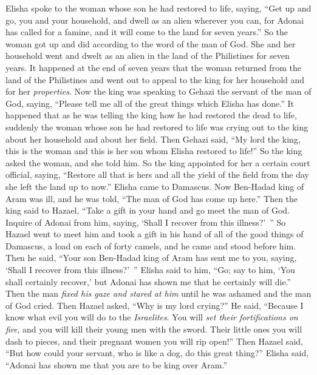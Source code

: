 \begin{biblechapter} %
 Elisha spoke to the woman whose son he had restored to life, saying, “Get up and go, you and your household, and dwell as an alien wherever you can, for Adonai has called for a famine, and it will come to the land for seven years.”
\verse So the woman got up and did according to the word of the man of God. She and her household went and dwelt as an alien in the land of the Philistines for seven years.
\verse It happened at the end of seven years that the woman returned from the land of the Philistines and went out to appeal to the king for her household and for her \textit{properties}.
\verse Now the king was speaking to Gehazi the servant of the man of God, saying, “Please tell me all of the great things which Elisha has done.”
\verse It happened that as he was telling the king how he had restored the dead to life, suddenly the woman whose son he had restored to life was crying out to the king about her household and about her field. Then Gehazi said, “My lord the king, this is the woman and this is her son whom Elisha restored to life!”
\verse So the king asked the woman, and she told him. So the king appointed for her a certain court official, saying, “Restore all that is hers and all the yield of the field from the day she left the land up to now.”
\verse Elisha came to Damascus. Now Ben-Hadad king of Aram was ill, and he was told, “The man of God has come up here.”
\verse Then the king said to Hazael, “Take a gift in your hand and go meet the man of God. Inquire of Adonai from him, saying, ‘Shall I recover from this illness?’ ”
\verse So Hazael went to meet him and took a gift in his hand of all of the good things of Damascus, a load on each of forty camels, and he came and stood before him. Then he said, “Your son Ben-Hadad king of Aram has sent me to you, saying, ‘Shall I recover from this illness?’ ”
\verse Elisha said to him, “Go; say to him, ‘You shall certainly recover,’ but Adonai has shown me that he certainly will die.”
\verse Then the man \textit{fixed his gaze and stared at him} until he was ashamed and the man of God cried.
\verse Then Hazael asked, “Why is my lord crying?” He said, “Because I know what evil you will do to the \textit{Israelites}. You will \textit{set their fortifications on fire}, and you will kill their young men with the sword. Their little ones you will dash to pieces, and their pregnant women you will rip open!”
\verse Then Hazael said, “But how could your servant, who is like a dog, do this great thing?” Elisha said, “Adonai has shown me that you are to be king over Aram.”

\end{biblechapter}
